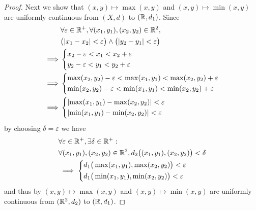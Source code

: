 \begin{proof}
  Next we show that \((x, y) \mapsto \max(x, y)\) and \((x, y) \mapsto \min(x, y)\) are uniformly continuous from \((X, d)\) to \((\mathbb{R}, d_1)\).
  Since
  \begin{align*}
             & \forall \varepsilon \in \R^+, \forall (x_1, y_1), (x_2, y_2) \in \R^2,                \\
             & \big(\abs{x_1 - x_2} < \varepsilon\big) \land \big(\abs{y_2 - y_1} < \varepsilon\big) \\
    \implies & \begin{dcases}
                 x_2 - \varepsilon < x_1 < x_2 + \varepsilon \\
                 y_2 - \varepsilon < y_1 < y_2 + \varepsilon \\
               \end{dcases}                                           \\
    \implies & \begin{dcases}
                 \max(x_2, y_2) - \varepsilon < \max(x_1, y_1) < \max(x_2, y_2) + \varepsilon \\
                 \min(x_2, y_2) - \varepsilon < \min(x_1, y_1) < \min(x_2, y_2) + \varepsilon
               \end{dcases}          \\
    \implies & \begin{dcases}
                 \abs{\max(x_1, y_1) - \max(x_2, y_2)} < \varepsilon \\
                 \abs{\min(x_1, y_1) - \min(x_2, y_2)} < \varepsilon
               \end{dcases}
  \end{align*}
  by choosing \(\delta = \varepsilon\) we have
  \begin{align*}
     & \forall \varepsilon \in \mathbb{R}^+, \exists \delta \in \mathbb{R}^+ :                               \\
     & \forall (x_1, y_1), (x_2, y_2) \in \mathbb{R}^2, d_2\big((x_1, y_1), (x_2, y_2)\big) < \delta \\
     & \implies \begin{dcases}
                  d_1\big(\max(x_1, y_1), \max(x_2, y_2)\big) < \varepsilon \\
                  d_1\big(\min(x_1, y_1), \min(x_2, y_2)\big) < \varepsilon
                \end{dcases}
  \end{align*}
  and thus by  \((x, y) \mapsto \max(x, y)\) and \((x, y) \mapsto \min(x, y)\) are uniformly continuous from \((\mathbb{R}^2, d_2)\) to \((\mathbb{R}, d_1)\).


\end{proof}
